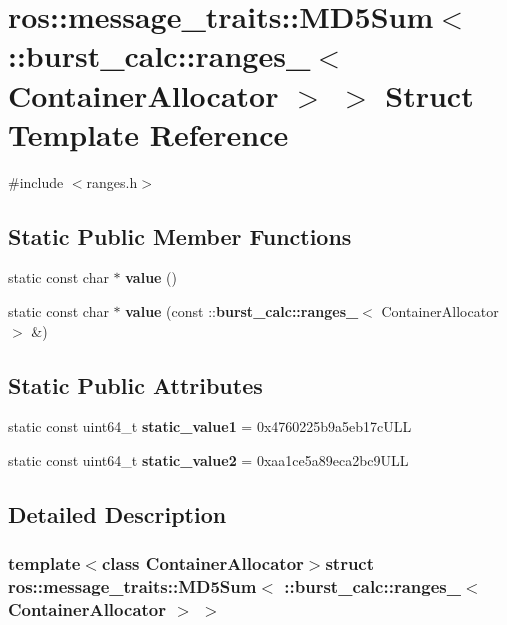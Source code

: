 \section{ros\-:\-:message\-\_\-traits\-:\-:\-M\-D5\-Sum$<$ \-:\-:burst\-\_\-calc\-:\-:ranges\-\_\-$<$ \-Container\-Allocator $>$ $>$ \-Struct \-Template \-Reference}
\label{structros_1_1message__traits_1_1MD5Sum_3_01_1_1burst__calc_1_1ranges___3_01ContainerAllocator_01_4_01_4}


{\ttfamily \#include $<$ranges.\-h$>$}

\subsection*{\-Static \-Public \-Member \-Functions}
\begin{DoxyCompactItemize}
\item 
static const char $\ast$ {\bf value} ()
\item 
static const char $\ast$ {\bf value} (const \-::{\bf burst\-\_\-calc\-::ranges\-\_\-}$<$ \-Container\-Allocator $>$ \&)
\end{DoxyCompactItemize}
\subsection*{\-Static \-Public \-Attributes}
\begin{DoxyCompactItemize}
\item 
static const uint64\-\_\-t {\bf static\-\_\-value1} = 0x4760225b9a5eb17c\-U\-L\-L
\item 
static const uint64\-\_\-t {\bf static\-\_\-value2} = 0xaa1ce5a89eca2bc9\-U\-L\-L
\end{DoxyCompactItemize}


\subsection{\-Detailed \-Description}
\subsubsection*{template$<$class Container\-Allocator$>$struct ros\-::message\-\_\-traits\-::\-M\-D5\-Sum$<$ \-::burst\-\_\-calc\-::ranges\-\_\-$<$ Container\-Allocator $>$ $>$}



